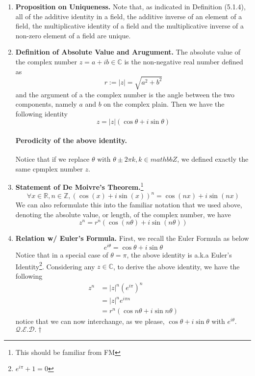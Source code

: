 \documentclass[oneside, 12pt]{book}
\newcommand{\settag}[1]{\renewcommand{\theenumi}{#1}}
\newcommand{\R}{\mathbb{R}}
\newcommand{\complex}{\mathbb{C}}
\newcommand{\qed}{\hfill $\mathcal{Q}.\mathcal{E}.\mathcal{D}.\dagger$}
\newcommand{\tbf}[1]{\textbf{#1}}
\newcommand{\para}[1]{\item \tbf{#1}}
\begin{document}
\begin{enumerate}
    \settag{5.1.7}
    \para{Proposition on Uniqueness.} Note that, as indicated in Definition (5.1.4), all of the additive identity in a field, 
    the additive inverse of an element of a field, the multiplicative identity of a field and the multiplicative inverse of a 
    non-zero element of a field are unique.

    \settag{5.1.8}
    \para{Definition of Absolute Value and Arugument.} The absolute value of the complex number $z = a + ib\in \complex$
    is the non-negative real number defined as
    \begin{equation*}
        r := |z| = \sqrt{a^2 + b^2}
    \end{equation*}
    and the argument of a the complex number is the angle between the two components, namely $a$ and $b$
    on the complex plain. Then we have the following identity
    \begin{equation*}
        z = |z|(\cos \theta + i\sin \theta)
    \end{equation*}
    \paragraph{Perodicity of the above identity.} Notice that if we replace $\theta$ with $\theta \pm
    2\pi k, k\in mathbb{Z}$, we defined exactly the same cpmplex number $z$. 

    \settag{5.1.9}
    \para{Statement of De Moivre's Theorem.}\footnote{This should be familiar from FM}
    \begin{equation*}
        \forall x\in \R, n\in \mathbb{Z}, \left(\cos(x) + i\sin(x)\right)^n = \cos(nx) + i\sin(nx)
    \end{equation*}
    We can also reformulate this into the familiar notation that we used above, denoting the absolute
    value, or length, of the complex number, we have
    \begin{equation*}
        z^n = r^n\left(\cos(n\theta) + i\sin(n\theta)\right)
    \end{equation*}

    \settag{5.1.9*}
    \para{Relation w/ Euler's Formula.} First, we recall the Euler Formula as below
    \begin{equation*}
        e^{i\theta} = \cos \theta + i\sin \theta
    \end{equation*}
    Notice that in a special case of $\theta = \pi$, the above identity is a.k.a Euler's 
    Identity\footnote{$e^{i\pi}+1=0$}. Considering any $z\in \complex$, to derive the above identity, we have the following
    \begin{align*}
        z^n &= |z|^n\left(e^{i\pi}\right)^n\\
        &= |z|^ne^{i\pi n} \\
        &= r^n\left(\cos n\theta + i\sin n \theta\right)
    \end{align*}
    notice that we can now interchange, as we please, $\cos \theta + i\sin \theta$ with $e^{i\theta}$. \qed


\end{enumerate}
\end{document}
